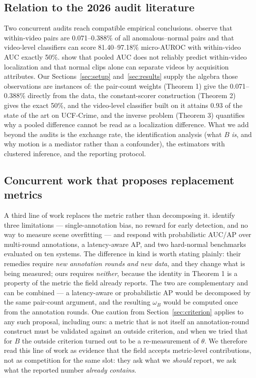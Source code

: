 \documentclass[number,preprint,12pt]{elsarticle}
\begin{document}
\subsection{Relation to the 2026 audit literature}\label{sec:audits}

Two concurrent audits reach compatible empirical conclusions.
\citet{song2026lookinside} observe that within-video pairs are 0.071--0.388\%
of all anomalous--normal pairs and that video-level classifiers can score
81.40--97.18\% micro-AUROC with within-video AUC exactly 50\%. \citet{abdulaziz2026auditing} show that pooled AUC does not reliably predict
within-video localization and that normal clips alone can separate videos by
acquisition attributes. Our Sections~\ref{sec:setup} and~\ref{sec:results} supply the algebra those observations are
instances of: the pair-count weights (Theorem 1) give the 0.071--0.388\% directly
from the data, the constant-scorer construction (Theorem 2) gives the exact 50\%,
and the video-level classifier built on it attains 0.93 of the state of the art on UCF-Crime,
and the inverse problem (Theorem 3) quantifies why a pooled difference cannot be
read as a localization difference. What we add beyond the audits is the exchange
rate, the identification analysis (what \(B\) \emph{is}, and why motion is a mediator
rather than a confounder), the estimators with clustered inference, and the
reporting protocol.

\subsection{Concurrent work that proposes replacement metrics}\label{sec:concurrent}

A third line of work replaces the metric rather than decomposing it. \citet{liu2025rethinking} identify three limitations --- single-annotation bias, no reward
for early detection, and no way to measure scene overfitting --- and respond with
probabilistic AUC/AP over multi-round annotations, a latency-aware AP, and two
hard-normal benchmarks evaluated on ten systems. The difference in kind is worth
stating plainly: their remedies require \emph{new annotation rounds and new data}, and
they change what is being measured; ours requires \emph{neither}, because the identity
in Theorem 1 is a property of the metric the field already reports. The two are
complementary and can be combined --- a latency-aware or probabilistic AP would be
decomposed by the same pair-count argument, and the resulting \(\omega_B\) would be
computed once from the annotation rounds. One caution from
Section~\ref{sec:criterion} applies to any such proposal, including ours: a
metric that is not itself an annotation-round construct must be validated
against an outside criterion, and when we tried that for \(B\) the outside
criterion turned out to be a re-measurement of \(\theta\). We therefore read this
line of work as evidence that the field accepts metric-level contributions, not
as competition for the same slot: they ask what we \emph{should} report, we ask what
the reported number \emph{already contains}.
\end{document}
